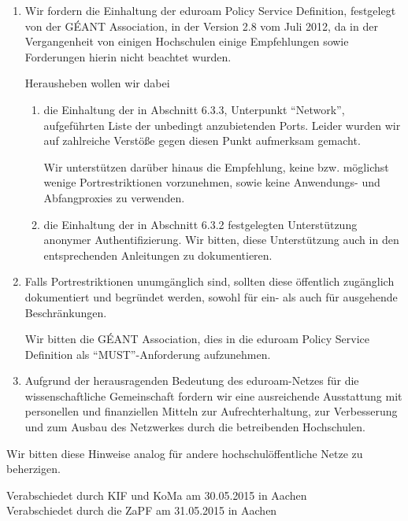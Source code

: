 \documentclass[DIV=calc]{scrartcl}
\begin{document}
\begin{enumerate}
\item Wir fordern die Einhaltung der eduroam Policy Service Definition,
  festgelegt von der GÉANT Association, in der Version 2.8 vom Juli 2012, da
  in der Vergangenheit von einigen Hochschulen einige Empfehlungen sowie
  Forderungen hierin nicht beachtet wurden.

  Herausheben wollen wir dabei
  \begin{enumerate}
  \item  die Einhaltung der in Abschnitt 6.3.3, Unterpunkt ``Network'',
    aufgeführten Liste der unbedingt anzubietenden Ports. Leider wurden wir
    auf zahlreiche Verstöße gegen diesen Punkt aufmerksam gemacht.

    Wir unterstützen darüber hinaus die Empfehlung, keine
    bzw. möglichst wenige Portrestriktionen vorzunehmen, sowie keine
    Anwendungs- und Abfangproxies zu verwenden.

  \item die Einhaltung der in Abschnitt 6.3.2 festgelegten Unterstützung
    anonymer Authentifizierung. Wir bitten, diese Unterstützung auch in den
    entsprechenden Anleitungen zu dokumentieren.
  \end{enumerate}
\item Falls Portrestriktionen unumgänglich sind, sollten diese öffentlich
  zugänglich dokumentiert und begründet werden, sowohl für ein- als auch für
  ausgehende Beschränkungen.

  Wir bitten die GÉANT Association, dies in die eduroam Policy Service Definition
  als ``MUST''-Anforderung aufzunehmen.

\item Aufgrund der herausragenden Bedeutung des eduroam-Netzes für die
  wissenschaftliche Gemeinschaft fordern wir eine ausreichende Ausstattung mit
  personellen und finanziellen Mitteln zur Aufrechterhaltung, zur Verbesserung
  und zum Ausbau des Netzwerkes durch die betreibenden Hochschulen.
\end{enumerate}

Wir bitten diese Hinweise analog für andere hochschulöffentliche Netze zu
beherzigen.

\vfill
\begin{flushright}
Verabschiedet durch KIF und KoMa am 30.05.2015 in Aachen \\
Verabschiedet durch die ZaPF am 31.05.2015 in Aachen
\end{flushright}
\end{document}

